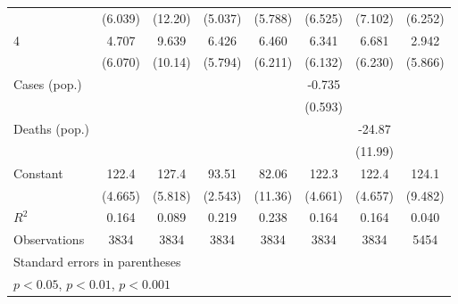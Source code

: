 \documentclass{article}
\begin{document}
{\begin{longtable}{l*{7}{c}}
                &  (6.039)         &  (12.20)         &  (5.037)         &  (5.788)         &  (6.525)         &  (7.102)         &  (6.252)         \\
4               &    4.707         &    9.639         &    6.426         &    6.460         &    6.341         &    6.681         &    2.942         \\
                &  (6.070)         &  (10.14)         &  (5.794)         &  (6.211)         &  (6.132)         &  (6.230)         &  (5.866)         \\
Cases (pop.)    &                  &                  &                  &                  &   -0.735         &                  &                  \\
                &                  &                  &                  &                  &  (0.593)         &                  &                  \\
Deaths (pop.)   &                  &                  &                  &                  &                  &   -24.87\sym{*}  &                  \\
                &                  &                  &                  &                  &                  &  (11.99)         &                  \\
Constant        &    122.4\sym{***}&    127.4\sym{***}&    93.51\sym{***}&    82.06\sym{***}&    122.3\sym{***}&    122.4\sym{***}&    124.1\sym{***}\\
                &  (4.665)         &  (5.818)         &  (2.543)         &  (11.36)         &  (4.661)         &  (4.657)         &  (9.482)         \\
\hline
\(R^{2}\)       &    0.164         &    0.089         &    0.219         &    0.238         &    0.164         &    0.164         &    0.040         \\
Observations    &     3834         &     3834         &     3834         &     3834         &     3834         &     3834         &     5454         \\
\hline\hline
\multicolumn{8}{l}{\footnotesize Standard errors in parentheses}\\
\multicolumn{8}{l}{\footnotesize \sym{*} \(p<0.05\), \sym{**} \(p<0.01\), \sym{***} \(p<0.001\)}\\
\end{longtable}
}
\end{document}
